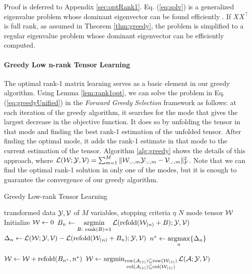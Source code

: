 Proof is deferred to Appendix \ref{sec:optRank1}. Eq. (\ref{eq:solv}) is a generalized eigenvalue problem whose dominant eigenvector can be found efficiently \cite{jpen2000}. If $XX^{\top}$ is full rank, as assumed in Theorem \ref{thm:greedy}, the problem is simplified to a  regular eigenvalue problem whose dominant eigenvector can be efficiently computed.

\paragraph{Greedy Low n-rank Tensor Learning} The optimal rank-1 matrix learning serves as a basic element in our greedy algorithm. 
Using Lemma \ref{lem:rank1opt}, we can solve the problem in Eq. (\ref{eq:greedyUnified}) in the \textit{Forward Greedy Selection} framework as follows:  at each iteration of the greedy algorithm, it searches for the mode that gives the largest decrease in the objective function. It does so by unfolding the tensor in that mode and finding the best rank-1 estimation of the unfolded tensor. After finding the optimal mode, it adds the rank-1 estimate in that mode to the current estimation of the tensor. Algorithm \ref{alg:greedy} shows the details of this approach, where $\mathcal{L}({\mathcal W};{\mathcal Y}, {\mathcal V} ) = \sum_{m=1}^{M} \|{\mathcal W}_{:, :, m}{\mathcal Y}_{:, :, m} - {\mathcal V}_{:, :, m} \|^2_F$.  Note that we can find the optimal rank-1 solution in only one of the modes, but it is enough to guarantee the convergence of our greedy algorithm. %

\begin{algorithm}[t]
 \caption{Greedy Low-rank Tensor Learning }
 \label{alg:greedy}
\begin{algorithmic}[1]
   transformed data ${\mathcal Y}, {\mathcal V}$ of $M$ variables, stopping criteria $\eta$
    $N$ mode tensor ${\mathcal W}$ 
  \STATE  Initialize ${\mathcal W} \gets 0$
  \REPEAT 
    \STATE $B_n \leftarrow  \operatorname*{argmin}\limits_{B:~\mathrm{rank}(B) = 1}\mathcal{L}(\mathrm{refold}({\mathcal W}_{(n)}+B); {\mathcal Y}, {\mathcal V})$
 	\STATE  
$\Delta_n\gets \mathcal{L}({\mathcal W};{\mathcal Y}, {\mathcal V} ) -  \mathcal{L}(\mathrm{refold}({\mathcal W}_{(n)}+B_n);{\mathcal Y}, {\mathcal V} )$
	\ENDFOR
	\STATE $ n^{*}\leftarrow \operatorname*{argmax}\limits_{n} \{\Delta_n\}$

 \STATE
 ${\mathcal W} \gets {\mathcal W} + \mathrm{refold}(B_{n^{*}},n^{*} )$
 \ENDIF
 \STATE ${\mathcal W} \gets \operatorname*{argmin}_{\begin{subarray}{c}\mathrm{row}({\mathcal A}_{(1)}) \subseteq \mathrm{row}({\mathcal W}_{(1)})\\ \mathrm{col}({\mathcal A}_{(1)}) \subseteq \mathrm{col}({\mathcal W}_{(1)})\end{subarray} } \mathcal{L}({\mathcal A};{\mathcal Y}, {\mathcal V} ) $ 
\end{algorithmic}
\end{algorithm}

